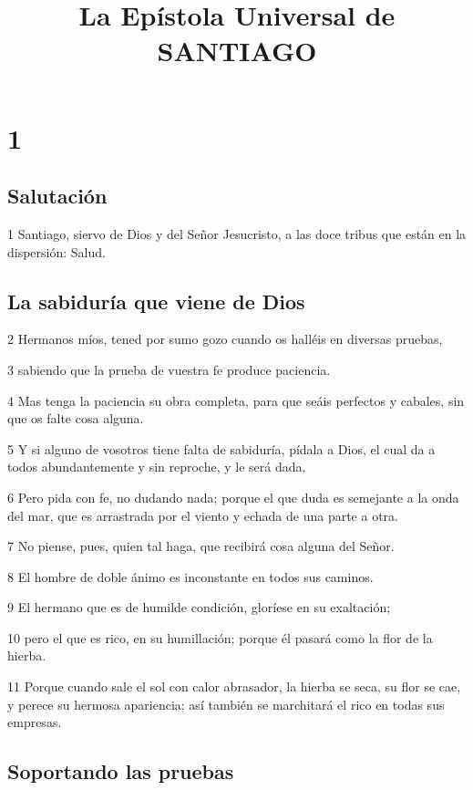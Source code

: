 
\title{La Epístola Universal de SANTIAGO}

\chapter{1}

\section*{Salutación}

\par 1 Santiago, siervo de Dios y del Señor Jesucristo, a las doce tribus que están en la dispersión: Salud.

\section*{La sabiduría que viene de Dios}

\par 2 Hermanos míos, tened por sumo gozo cuando os halléis en diversas pruebas,
\par 3 sabiendo que la prueba de vuestra fe produce paciencia.
\par 4 Mas tenga la paciencia su obra completa, para que seáis perfectos y cabales, sin que os falte cosa alguna.
\par 5 Y si alguno de vosotros tiene falta de sabiduría, pídala a Dios, el cual da a todos abundantemente y sin reproche, y le será dada.
\par 6 Pero pida con fe, no dudando nada; porque el que duda es semejante a la onda del mar, que es arrastrada por el viento y echada de una parte a otra.
\par 7 No piense, pues, quien tal haga, que recibirá cosa alguna del Señor.
\par 8 El hombre de doble ánimo es inconstante en todos sus caminos.
\par 9 El hermano que es de humilde condición, gloríese en su exaltación;
\par 10 pero el que es rico, en su humillación; porque él pasará como la flor de la hierba.
\par 11 Porque cuando sale el sol con calor abrasador, la hierba se seca, su flor se cae, y perece su hermosa apariencia; así también se marchitará el rico en todas sus empresas.

\section*{Soportando las pruebas}

